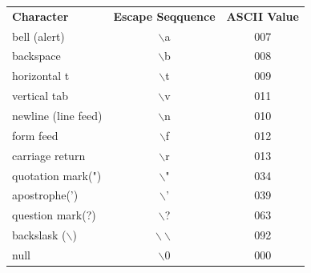 \begin{table}[!h]
\begin{center}
\caption{Escape Sequences}
\begin{longtable}{lcc}
\textbf{Character}&\textbf{Escape Seqquence}&\textbf{ASCII Value}\\
bell (alert)&$\backslash$a&007\\
backspace&$\backslash$b&008\\
horizontal t&$\backslash$t&009\\
vertical tab&$\backslash$v&011\\
newline (line feed)&$\backslash$n&010\\
form feed&$\backslash$f&012\\
carriage return&$\backslash$r&013\\
quotation mark(")&$\backslash$"&034\\
apostrophe(')&$\backslash$'&039\\
question mark(?)&$\backslash$?&063\\
backslask ($\backslash$)&$\backslash\backslash$&092\\
null&$\backslash$0&000
\end{longtable}
\end{center}
\end{table}
